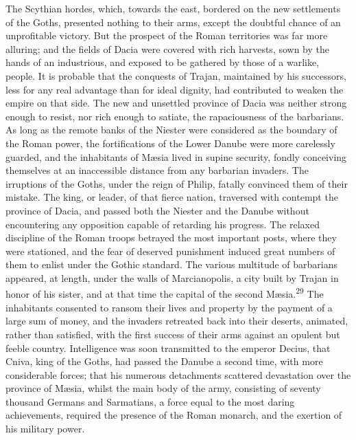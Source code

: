 
The Scythian hordes, which, towards the east, bordered on the new
settlements of the Goths, presented nothing to their arms, except
the doubtful chance of an unprofitable victory. But the prospect
of the Roman territories was far more alluring; and the fields of
Dacia were covered with rich harvests, sown by the hands of an
industrious, and exposed to be gathered by those of a warlike,
people. It is probable that the conquests of Trajan, maintained
by his successors, less for any real advantage than for ideal
dignity, had contributed to weaken the empire on that side. The
new and unsettled province of Dacia was neither strong enough to
resist, nor rich enough to satiate, the rapaciousness of the
barbarians. As long as the remote banks of the Niester were
considered as the boundary of the Roman power, the fortifications
of the Lower Danube were more carelessly guarded, and the
inhabitants of Mæsia lived in supine security, fondly conceiving
themselves at an inaccessible distance from any barbarian
invaders. The irruptions of the Goths, under the reign of Philip,
fatally convinced them of their mistake. The king, or leader, of
that fierce nation, traversed with contempt the province of
Dacia, and passed both the Niester and the Danube without
encountering any opposition capable of retarding his progress.
The relaxed discipline of the Roman troops betrayed the most
important posts, where they were stationed, and the fear of
deserved punishment induced great numbers of them to enlist under
the Gothic standard. The various multitude of barbarians
appeared, at length, under the walls of Marcianopolis, a city
built by Trajan in honor of his sister, and at that time the
capital of the second Mæsia.\textsuperscript{29} The inhabitants consented to
ransom their lives and property by the payment of a large sum of
money, and the invaders retreated back into their deserts,
animated, rather than satisfied, with the first success of their
arms against an opulent but feeble country. Intelligence was soon
transmitted to the emperor Decius, that Cniva, king of the Goths,
had passed the Danube a second time, with more considerable
forces; that his numerous detachments scattered devastation over
the province of Mæsia, whilst the main body of the army,
consisting of seventy thousand Germans and Sarmatians, a force
equal to the most daring achievements, required the presence of
the Roman monarch, and the exertion of his military power.

